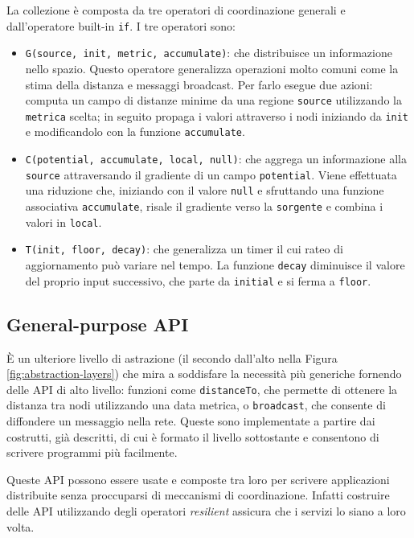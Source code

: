 La collezione è composta da tre operatori di coordinazione generali e
dall'operatore built-in \texttt{if}. I tre operatori sono:
\begin{itemize}
\item \texttt{G(source, init, metric, accumulate)}: che distribuisce un
  informazione nello spazio. Questo operatore generalizza operazioni molto
  comuni come la stima della distanza e messaggi broadcast. Per farlo esegue due
  azioni: computa un campo di distanze minime da una regione \texttt{source}
  utilizzando la \texttt{metrica} scelta; in seguito propaga i valori attraverso
  i nodi iniziando da \texttt{init} e modificandolo con la funzione
  \texttt{accumulate}.
\item \texttt{C(potential, accumulate, local, null)}: che aggrega un
  informazione alla \texttt{source} attraversando il gradiente di un campo
  \texttt{potential}. Viene effettuata una riduzione che, iniziando con il valore
  \texttt{null} e sfruttando una funzione associativa \texttt{accumulate},
  risale il gradiente verso la \texttt{sorgente} e combina i valori in
  \texttt{local}.
\item \texttt{T(init, floor, decay)}: che generalizza un timer il cui rateo di
  aggiornamento può variare nel tempo. La funzione \texttt{decay} diminuisce il
  valore del proprio input successivo, che parte da \texttt{initial} e si ferma
  a \texttt{floor}.
\end{itemize}

\subsection{General-purpose API}
È un ulteriore livello di astrazione (il secondo dall'alto nella Figura
\ref{fig:abstraction-layers}) che mira a soddisfare la necessità più generiche
fornendo delle API di alto livello: funzioni come \texttt{distanceTo}, che
permette di ottenere la distanza tra nodi utilizzando una data metrica, o
\texttt{broadcast}, che consente di diffondere un messaggio nella rete. Queste
sono implementate a partire dai costrutti, già descritti, di cui è formato il
livello sottostante e consentono di scrivere programmi più facilmente.

Queste API possono essere usate e composte tra loro per scrivere applicazioni
distribuite senza proccuparsi di meccanismi di coordinazione. Infatti costruire
delle API utilizzando degli operatori \textit{resilient} assicura che i servizi
lo siano a loro volta.

